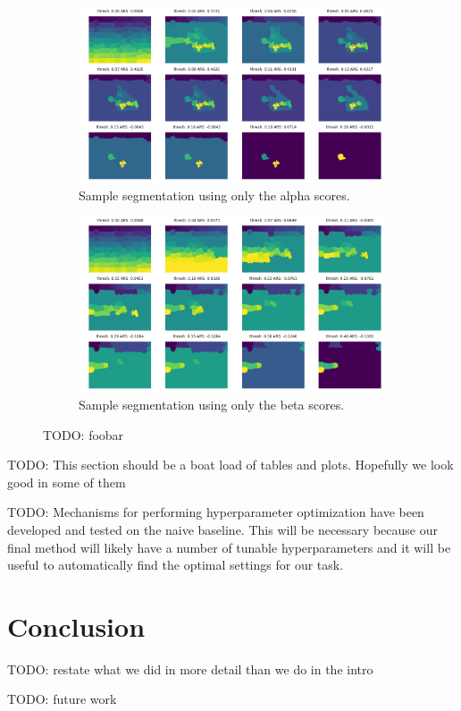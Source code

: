 \documentclass[twocolumn]{article}
\newcommand{\todo}[1]{}
\renewcommand{\todo}[1]{{\color{red} TODO: {#1}}}
\newcommand{\figlab}[1]{\label{fig:#1}}
\begin{document}
\begin{figure}
  \centering

  \begin{subfigure}{\linewidth}
    \includegraphics[width=\linewidth]{figs/only_alpha.png}
    \caption{Sample segmentation using only the alpha scores.}
  \end{subfigure}
  \begin{subfigure}{\linewidth}
    \includegraphics[width=\linewidth]{figs/only_beta.png}
    \caption{Sample segmentation using only the beta scores.}
  \end{subfigure}

  \caption{
    \todo{foobar}
  }
  \figlab{ab_only}

\end{figure}

\todo{This section should be a boat load of tables and plots. Hopefully we look good in some of them}

\todo{
Mechanisms for performing hyperparameter optimization have been developed and tested on the naive baseline. This will be
necessary because our final method will likely have a number of tunable hyperparameters and it will be useful to automatically
find the optimal settings for our task.
}

\section{Conclusion}

\todo{restate what we did in more detail than we do in the intro}

\todo{future work}


 
\end{document}
